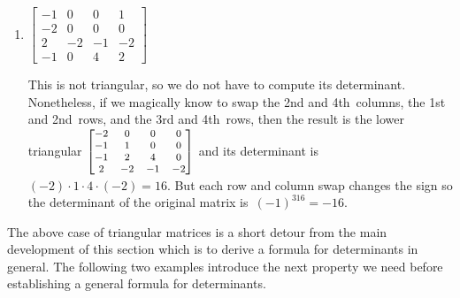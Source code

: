\begin{example}
\begin{enumerate}
\item \(\begin{bmatrix}-1&0&0&1
\\-2&0&0&0
\\2&-2&-1&-2
\\-1&0&4&2\end{bmatrix}\)
\begin{solution} 
This is not triangular, so we do not have to compute its determinant. 
Nonetheless, if we magically know to swap the 2nd and 4th~columns, the 1st and 2nd~rows, and the 3rd and 4th~rows, then the result is the lower triangular \(\footnotesize\begin{bmatrix}-2&0&0&0
\\-1&1&0&0
\\-1&2&4&0
\\2&-2&-1&-2\end{bmatrix}\) and its determinant is \((-2)\cdot1\cdot4\cdot(-2)=16\). 
But each row and column swap changes the sign so the determinant of the original matrix is~\((-1)^316=-16\). 
\end{solution}
\end{enumerate}
\end{example}



The above case of triangular matrices is a short detour from the main development of this section which is to derive a formula for determinants in general.
The following two examples introduce the next property we need before establishing a general formula for determinants.


